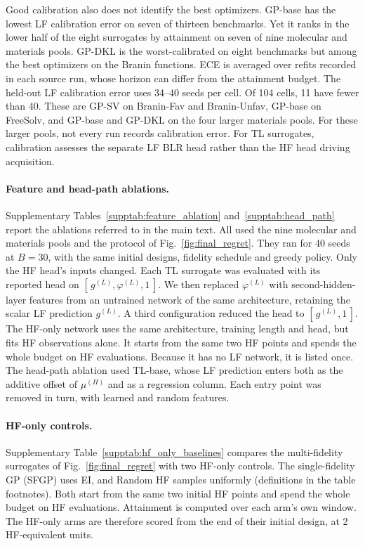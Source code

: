 Good calibration also does not identify the best optimizers. GP-base has the lowest LF calibration error on seven of thirteen benchmarks. Yet it ranks in the lower half of the eight surrogates by attainment on seven of nine molecular and materials pools. GP-DKL is the worst-calibrated on eight benchmarks but among the best optimizers on the Branin functions. ECE is averaged over refits recorded in each source run, whose horizon can differ from the attainment budget. The held-out LF calibration error uses 34--40 seeds per cell. Of 104 cells, 11 have fewer than 40. These are GP-SV on Branin-Fav and Branin-Unfav, GP-base on FreeSolv, and GP-base and GP-DKL on the four larger materials pools. For these larger pools, not every run records calibration error. For TL surrogates, calibration assesses the separate LF BLR head rather than the HF head driving acquisition.







\paragraph{Feature and head-path ablations.} Supplementary Tables~\ref{supptab:feature_ablation} and~\ref{supptab:head_path} report the ablations referred to in the main text. All used the nine molecular and materials pools and the protocol of Fig.~\ref{fig:final_regret}. They ran for 40 seeds at $B = 30$, with the same initial designs, fidelity schedule and greedy policy. Only the HF head's inputs changed. Each TL surrogate was evaluated with its reported head on $[\,g^{(L)}, \varphi^{(L)}, 1\,]$. We then replaced $\varphi^{(L)}$ with second-hidden-layer features from an untrained network of the same architecture, retaining the scalar LF prediction $g^{(L)}$. A third configuration reduced the head to $[\,g^{(L)}, 1\,]$. The HF-only network uses the same architecture, training length and head, but fits HF observations alone. It starts from the same two HF points and spends the whole budget on HF evaluations. Because it has no LF network, it is listed once. The head-path ablation used TL-base, whose LF prediction enters both as the additive offset of $\mu^{(H)}$ and as a regression column. Each entry point was removed in turn, with learned and random features.

\paragraph{HF-only controls.} Supplementary Table~\ref{supptab:hf_only_baselines} compares the multi-fidelity surrogates of Fig.~\ref{fig:final_regret} with two HF-only controls. The single-fidelity GP (SFGP) uses EI, and Random HF samples uniformly (definitions in the table footnotes). Both start from the same two initial HF points and spend the whole budget on HF evaluations. Attainment is computed over each arm's own window. The HF-only arms are therefore scored from the end of their initial design, at 2 HF-equivalent units.

